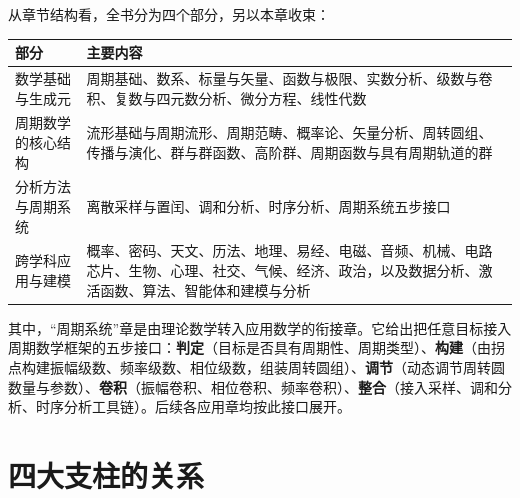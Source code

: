 从章节结构看，全书分为四个部分，另以本章收束：

\begin{center}
\renewcommand{\arraystretch}{1.25}
\begin{tabular}{@{}p{3.2cm}p{8.5cm}@{}}
\toprule
\textbf{部分} & \textbf{主要内容} \\
\midrule
数学基础与生成元 & 周期基础、数系、标量与矢量、函数与极限、实数分析、级数与卷积、复数与四元数分析、微分方程、线性代数 \\
周期数学的核心结构 & 流形基础与周期流形、周期范畴、概率论、矢量分析、周转圆组、传播与演化、群与群函数、高阶群、周期函数与具有周期轨道的群 \\
分析方法与周期系统 & 离散采样与置闰、调和分析、时序分析、周期系统五步接口 \\
跨学科应用与建模 & 概率、密码、天文、历法、地理、易经、电磁、音频、机械、电路芯片、生物、心理、社交、气候、经济、政治，以及数据分析、激活函数、算法、智能体和建模与分析 \\
\bottomrule
\end{tabular}
\end{center}

其中，“周期系统”章是由理论数学转入应用数学的衔接章。它给出把任意目标接入周期数学框架的五步接口：\textbf{判定}（目标是否具有周期性、周期类型）、\textbf{构建}（由拐点构建振幅级数、频率级数、相位级数，组装周转圆组）、\textbf{调节}（动态调节周转圆数量与参数）、\textbf{卷积}（振幅卷积、相位卷积、频率卷积）、\textbf{整合}（接入采样、调和分析、时序分析工具链）。后续各应用章均按此接口展开。

\section{四大支柱的关系}


